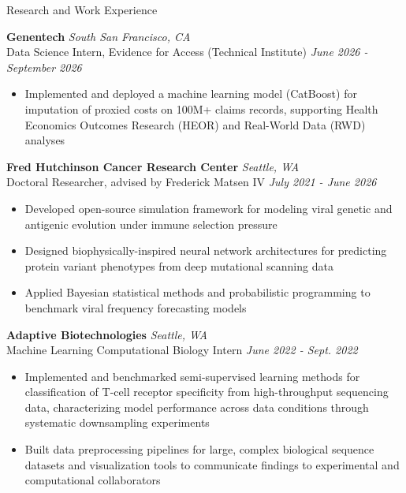 \documentclass{resume} %
\begin{document}
\begin{rSection}{Research and Work Experience}

{\bf Genentech} \hfill {\em South San Francisco, CA}\\
{Data Science Intern, Evidence for Access (Technical Institute)} \hfill {\em June 2026 - September 2026}
\begin{itemize}
    \item Implemented and deployed a machine learning model (CatBoost) for imputation of proxied costs on 100M+ claims records, supporting Health Economics Outcomes Research (HEOR) and Real-World Data (RWD) analyses
\end{itemize}

{\bf Fred Hutchinson Cancer Research Center} \hfill { \em Seattle, WA}\\
{Doctoral Researcher, advised by Frederick Matsen IV} \hfill {\em July 2021 - June 2026}
\begin{itemize}
    \item Developed open-source simulation framework for modeling viral genetic and antigenic evolution under immune selection pressure
    \item Designed biophysically-inspired neural network architectures for predicting protein variant phenotypes from deep mutational scanning data
    \item Applied Bayesian statistical methods and probabilistic programming to benchmark viral frequency forecasting models
\end{itemize}

{\bf Adaptive Biotechnologies} \hfill {\em Seattle, WA} \\
{Machine Learning Computational Biology Intern} \hfill {\em June 2022 - Sept. 2022}
\begin{itemize}
    \item Implemented and benchmarked semi-supervised learning methods for classification of T-cell receptor specificity from high-throughput sequencing data, characterizing model performance across data conditions through systematic downsampling experiments
    \item Built data preprocessing pipelines for large, complex biological sequence datasets and visualization tools to communicate findings to experimental and computational collaborators
\end{itemize}


\end{rSection}
\end{document}
